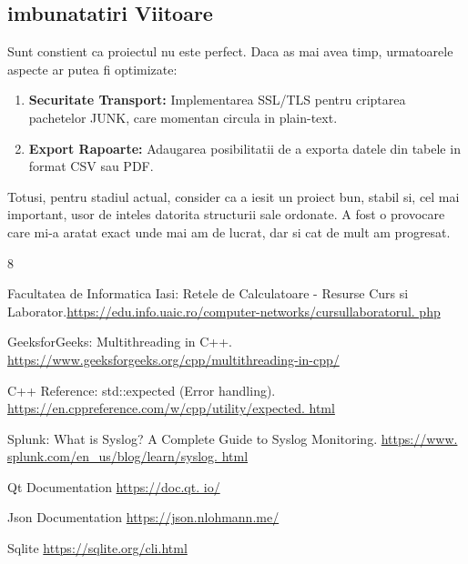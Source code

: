 \documentclass[runningheads]{llncs}
\begin{document}
\subsection{imbunatatiri Viitoare}
Sunt constient ca proiectul nu este perfect. Daca as mai avea timp, urmatoarele aspecte ar putea fi optimizate:
\begin{enumerate}
    \item \textbf{Securitate Transport:} Implementarea SSL/TLS pentru criptarea pachetelor JUNK, care momentan circula in plain-text.
    \item \textbf{Export Rapoarte:} Adaugarea posibilitatii de a exporta datele din tabele in format CSV sau PDF.
\end{enumerate}

Totusi, pentru stadiul actual, consider ca a iesit un proiect bun, stabil si, cel mai important, usor de inteles datorita structurii sale ordonate. A fost o provocare care mi-a aratat exact unde mai am de lucrat, dar si cat de mult am progresat.

\begin{thebibliography}{8}

Facultatea de Informatica Iasi: Retele de Calculatoare - Resurse Curs si Laborator.\url{https://edu.info.uaic.ro/computer-networks/cursullaboratorul. php}

GeeksforGeeks: Multithreading in C++. \url{https://www.geeksforgeeks.org/cpp/multithreading-in-cpp/}

C++ Reference: std::expected (Error handling). \url{https://en.cppreference.com/w/cpp/utility/expected. html}

Splunk: What is Syslog? A Complete Guide to Syslog Monitoring. \url{https://www. splunk.com/en_us/blog/learn/syslog. html} 

Qt Documentation \url{https://doc.qt. io/} 

Json Documentation \url{https://json.nlohmann.me/} 

Sqlite \url{https://sqlite.org/cli.html} 

\end{thebibliography}
\end{document}
